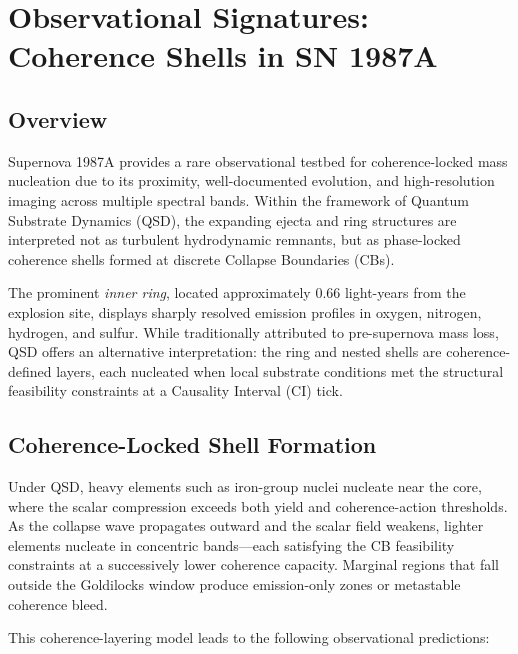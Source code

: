 \documentclass[preprints,article,submit,pdftex,moreauthors]{Definitions/mdpi}
\begin{document}
\section[\appendixname~\thesection]{Observational Signatures: Coherence Shells in SN 1987A}
\label{app:sn1987a}
\subsection[\appendixname~\thesubsection]{Overview}

Supernova 1987A provides a rare observational testbed for coherence-locked mass nucleation due to its proximity, well-documented evolution, and high-resolution imaging across multiple spectral bands. Within the framework of Quantum Substrate Dynamics (QSD), the expanding ejecta and ring structures are interpreted not as turbulent hydrodynamic remnants, but as phase-locked coherence shells formed at discrete Collapse Boundaries (CBs).

The prominent \emph{inner ring}, located approximately 0.66 light-years from the explosion site, displays sharply resolved emission profiles in oxygen, nitrogen, hydrogen, and sulfur. While traditionally attributed to pre-supernova mass loss, QSD offers an alternative interpretation: the ring and nested shells are coherence-defined layers, each nucleated when local substrate conditions met the structural feasibility constraints at a Causality Interval (CI) tick.

\subsection[\appendixname~\thesubsection]{Coherence-Locked Shell Formation}

Under QSD, heavy elements such as iron-group nuclei nucleate near the core, where the scalar compression exceeds both yield and coherence-action thresholds. As the collapse wave propagates outward and the scalar field weakens, lighter elements nucleate in concentric bands—each satisfying the CB feasibility constraints at a successively lower coherence capacity. Marginal regions that fall outside the Goldilocks window produce emission-only zones or metastable coherence bleed.

This coherence-layering model leads to the following observational predictions:
\end{document}
